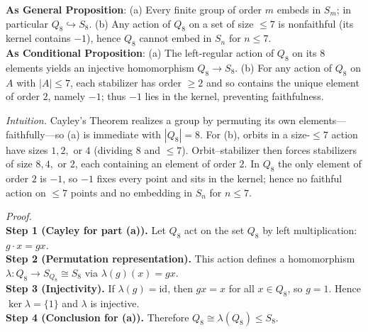\documentclass[11pt]{article}
\theoremstyle{definition}
\begin{document}
\noindent\textbf{As General Proposition}: (a) Every finite group of order $m$ embeds in $S_m$; in particular $Q_8\hookrightarrow S_8$. (b) Any action of $Q_8$ on a set of size $\le 7$ is nonfaithful (its kernel contains $-1$), hence $Q_8$ cannot embed in $S_n$ for $n\le 7$.\\

\noindent\textbf{As Conditional Proposition}: (a) The left-regular action of $Q_8$ on its $8$ elements yields an injective homomorphism $Q_8\to S_8$. (b) For any action of $Q_8$ on $A$ with $|A|\le 7$, each stabilizer has order $\ge 2$ and so contains the unique element of order $2$, namely $-1$; thus $-1$ lies in the kernel, preventing faithfulness.

\newpage

\dotfill

\emph{Intuition.} Cayley’s Theorem realizes a group by permuting its own elements—faithfully—so (a) is immediate with $|Q_8|=8$. For (b), orbits in a size-$\le 7$ action have sizes $1,2,$ or $4$ (dividing $8$ and $\le 7$). Orbit–stabilizer then forces stabilizers of size $8,4,$ or $2$, each containing an element of order $2$. In $Q_8$ the only element of order $2$ is $-1$, so $-1$ fixes every point and sits in the kernel; hence no faithful action on $\le 7$ points and no embedding in $S_n$ for $n\le 7$.\\

\dotfill

\emph{Proof.}\\
\textbf{Step 1 (Cayley for part (a)).} Let $Q_8$ act on the set $Q_8$ by left multiplication: $g\cdot x=gx$.\\
\textbf{Step 2 (Permutation representation).} This action defines a homomorphism $\lambda:Q_8\to S_{Q_8}\cong S_8$ via $\lambda(g)(x)=gx$.\\
\textbf{Step 3 (Injectivity).} If $\lambda(g)=\mathrm{id}$, then $gx=x$ for all $x\in Q_8$, so $g=1$. Hence $\ker\lambda=\{1\}$ and $\lambda$ is injective.\\
\textbf{Step 4 (Conclusion for (a)).} Therefore $Q_8\cong \lambda(Q_8)\le S_8$.\\[4pt]
\end{document}
